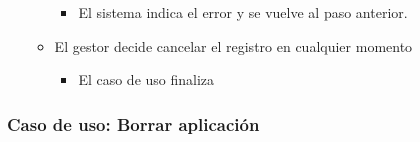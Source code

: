 \documentclass[12pt,a4paperpaper,]{report}
\providecommand{\tightlist}{%
  \setlength{\itemsep}{0pt}\setlength{\parskip}{0pt}}
\begin{document}
\begin{itemize}
\begin{itemize}
    \begin{itemize}
    \tightlist
    \item
      El sistema indica el error y se vuelve al paso anterior.
    \end{itemize}
  \item
    El gestor decide cancelar el registro en cualquier momento

    \begin{itemize}
    \tightlist
    \item
      El caso de uso finaliza
    \end{itemize}
  \end{itemize}
\end{itemize}

\subsubsection{Caso de uso: Borrar
aplicación}\label{caso-de-uso-borrar-aplicaciuxf3n}
\end{document}
